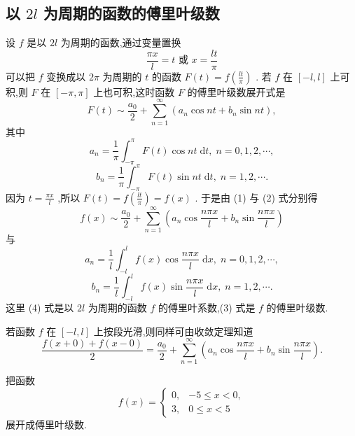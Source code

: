 \subsection{以 \({2l}\) 为周期的函数的傅里叶级数}

设 \(f\) 是以 \({2l}\) 为周期的函数,通过变量置换
\[
\frac{\pi x}{l} = t\text{ 或 }x = \frac{lt}{\pi }
\]
可以把 \(f\) 变换成以 \({2\pi }\) 为周期的 \(t\) 的函数 \(F\left( t\right)  = f\left( \frac{lt}{\pi }\right)\) . 若 \(f\) 在 \(\left\lbrack  {-l,l}\right\rbrack\) 上可积,则 \(F\) 在 \(\left\lbrack  {-\pi ,\pi }\right\rbrack\) 上也可积,这时函数 \(F\) 的傅里叶级数展开式是
\[
F\left( t\right)  \sim  \frac{{a}_{0}}{2} + \mathop{\sum }\limits_{{n = 1}}^{\infty }\left( {{a}_{n}\cos {nt} + {b}_{n}\sin {nt}}\right) , \tag{1}
\]
其中
\[
{a}_{n} = \frac{1}{\pi }{\int }_{-\pi }^{\pi }F\left( t\right) \cos {nt}\mathrm{\;d}t,\;n = 0,1,2,\cdots , \tag{2}
\]
\[
{b}_{n} = \frac{1}{\pi }{\int }_{-\pi }^{\pi }F\left( t\right) \sin {nt}\mathrm{\;d}t,\;n = 1,2,\cdots .
\]
因为 \(t = \frac{\pi x}{l}\) ,所以 \(F\left( t\right)  = f\left( \frac{lt}{\pi }\right)  = f\left( x\right)\) . 于是由 (1) 与 (2) 式分别得
\[
f\left( x\right)  \sim  \frac{{a}_{0}}{2} + \mathop{\sum }\limits_{{n = 1}}^{\infty }\left( {{a}_{n}\cos \frac{n\pi x}{l} + {b}_{n}\sin \frac{n\pi x}{l}}\right)  \tag{3}
\]
与
\[
{a}_{n} = \frac{1}{l}{\int }_{-l}^{l}f\left( x\right) \cos \frac{n\pi x}{l}\mathrm{\;d}x,\;n = 0,1,2,\cdots , \tag{4}
\]
\[
{b}_{n} = \frac{1}{l}{\int }_{-l}^{l}f\left( x\right) \sin \frac{n\pi x}{l}\mathrm{\;d}x,\;n = 1,2,\cdots .
\]
这里 (4) 式是以 \({2l}\) 为周期的函数 \(f\) 的傅里叶系数,(3) 式是 \(f\) 的傅里叶级数.

若函数 \(f\) 在 \(\left\lbrack  {-l,l}\right\rbrack\) 上按段光滑,则同样可由收敛定理知道
\[
\frac{f\left( {x + 0}\right)  + f\left( {x - 0}\right) }{2} = \frac{{a}_{0}}{2} + \mathop{\sum }\limits_{{n = 1}}^{\infty }\left( {{a}_{n}\cos \frac{n\pi x}{l} + {b}_{n}\sin \frac{n\pi x}{l}}\right) . \tag{5}
\]
\begin{example}

\end{example}
把函数
\[
f\left( x\right)  = \left\{  \begin{array}{ll} 0, &  - 5 \leq  x < 0, \\  3, & 0 \leq  x < 5 \end{array}\right.
\]
展开成傅里叶级数.

